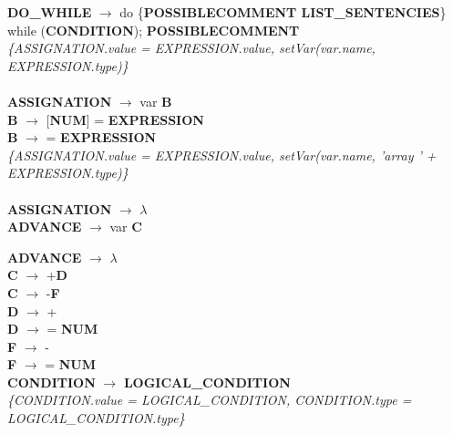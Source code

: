 \documentclass[10pt,a4paper]{article}
\begin{document}
\textbf{DO\_WHILE} $\rightarrow$ do \{\textbf{POSSIBLECOMMENT LIST\_SENTENCIES}\} while (\textbf{CONDITION}); \textbf{POSSIBLECOMMENT} \\


\textit{\{ASSIGNATION.value = EXPRESSION.value, setVar(var.name, EXPRESSION.type)\}}  \\ \\

\textbf{ASSIGNATION} $\rightarrow$ var \textbf{B} \\

\textbf{B} $\rightarrow$ [\textbf{NUM}] = \textbf{EXPRESSION}  \\

\textbf{B} $\rightarrow$ = \textbf{EXPRESSION} \\

\textit{\{ASSIGNATION.value = EXPRESSION.value, setVar(var.name, 'array ' + EXPRESSION.type)\}}  \\ \\

\textbf{ASSIGNATION} $\rightarrow$ $\lambda$ \\


\textbf{ADVANCE} $\rightarrow$ var \textbf{C} 

\textbf{ADVANCE} $\rightarrow$ $\lambda$ \\

\textbf{C} $\rightarrow$ +\textbf{D} \\ 

\textbf{C} $\rightarrow$ -\textbf{F} \\

\textbf{D} $\rightarrow$ +   \\

\textbf{D} $\rightarrow$ = \textbf{NUM} \\

\textbf{F} $\rightarrow$ - \\

\textbf{F} $\rightarrow$ = \textbf{NUM} \\


\textbf{CONDITION} $\rightarrow$ \textbf{LOGICAL\_CONDITION}   \\
\textit{\{CONDITION.value = LOGICAL\_CONDITION,  CONDITION.type = LOGICAL\_CONDITION.type\}} \\ \\
\end{document}
